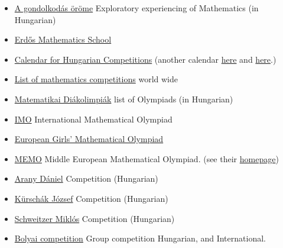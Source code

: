 \documentclass{article}
\begin{document}
\begin{itemize}
\begin{itemize}
        \item \href{https://agondolkodasorome.hu/}{A gondolkodás öröme} Exploratory experiencing of Mathematics (in Hungarian)
        
        \item \href{https://erdosiskola.mik.uni-pannon.hu/}{Erdős Mathematics School}
        
        \item \href{https://agondolkodasorome.hu/versenynaptar/}{Calendar for Hungarian Competitions} (another calendar \href{https://matek.fazekas.hu/index.php?option=com_content&view=article&id=688:2023-2024-versenynaptar&catid=9&Itemid=119}{here} and \href{https://matek.berzsenyi.hu/versenynapt%C3%A1r}{here}.)
        
        \item \href{https://molympiad.wordpress.com/list-of-mathematics-competitions/}{List of mathematics competitions} world wide

        \item \href{https://www.bolyai.hu/versenyek-matematikai-diakolimpiak/}{Matematikai Diákolimpiák} list of Olympiads (in Hungarian)
        
        \item \href{https://www.imo-official.org/}{IMO} International Mathematical Olympiad
        
        \item \href{https://www.egmo.org/}{European Girls’ Mathematical Olympiad}
        
        \item \href{https://memo-official.org/MEMO/contests/previous/}{MEMO} Middle European Mathematical Olympiad. (see their \href{https://www.memo-official.org/}{homepage})
        
        \item \href{https://www.bolyai.hu/versenyek-arany-daniel-matematikaverseny/}{Arany Dániel} Competition (Hungarian)
        
        \item \href{https://www.bolyai.hu/versenyek-kurschak-jozsef-matematikai-tanuloverseny/}{Kürschák József} Competition (Hungarian)
        
        \item \href{https://www.bolyai.hu/versenyek-schweitzer-miklos-emlekverseny/}{Schweitzer Miklós} Competition (Hungarian)
        
        \item \href{http://www.bolyaiverseny.hu/index.html}{Bolyai competition} Group competition Hungarian, and International.
        

\end{itemize}
\end{itemize}
\end{document}
